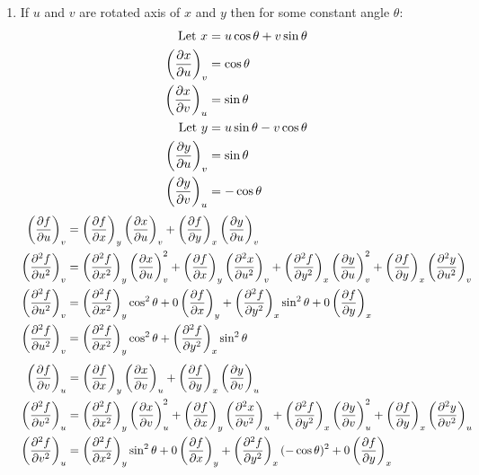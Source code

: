 \documentclass[10pt,\jkfside,a4paper]{article}
\begin{document}
\begin{enumerate}
\item If $u$ and $v$ are rotated axis of $x$ and $y$ then for some constant angle $\theta$:
\begin{equation}
\begin{split}
\text{Let } x &= u\cos\theta + v\sin\theta \\
\left(\pdv{x}{u}\right)_v &= \cos\theta \\
\left(\pdv{x}{v}\right)_u &= \sin\theta \\
\text{Let } y &= u\sin\theta - v\cos\theta \\
\left(\pdv{y}{u}\right)_v &= \sin\theta \\
\left(\pdv{y}{v}\right)_u &= -\cos\theta \\
\end{split}
\end{equation}
\begin{equation}
\begin{split}
\left(\pdv{f}{u}\right)_v &= \left(\pdv{f}{x}\right)_y\left(\pdv{x}{u}\right)_v + \left(\pdv{f}{y}\right)_x\left(\pdv{y}{u}\right)_v \\
\left(\pdv[2]{f}{u}\right)_v &= \left(\pdv[2]{f}{x}\right)_y\left(\pdv{x}{u}\right)^2_v + \left(\pdv{f}{x}\right)_y\left(\pdv[2]{x}{u}\right)_v + \left(\pdv[2]{f}{y}\right)_x\left(\pdv{y}{u}\right)^2_v + \left(\pdv{f}{y}\right)_x\left(\pdv[2]{y}{u}\right)_v\\
\left(\pdv[2]{f}{u}\right)_v &= \left(\pdv[2]{f}{x}\right)_y\cos^2\theta + 0\left(\pdv{f}{x}\right)_y + \left(\pdv[2]{f}{y}\right)_x\sin^2\theta + 0\left(\pdv{f}{y}\right)_x\\
\left(\pdv[2]{f}{u}\right)_v &= \left(\pdv[2]{f}{x}\right)_y\cos^2\theta + \left(\pdv[2]{f}{y}\right)_x\sin^2\theta \\
\end{split}
\end{equation}
\begin{equation}
\begin{split}
\left(\pdv{f}{v}\right)_u &= \left(\pdv{f}{x}\right)_y\left(\pdv{x}{v}\right)_u + \left(\pdv{f}{y}\right)_x\left(\pdv{y}{v}\right)_u \\
\left(\pdv[2]{f}{v}\right)_u &= \left(\pdv[2]{f}{x}\right)_y\left(\pdv{x}{v}\right)^2_u + \left(\pdv{f}{x}\right)_y\left(\pdv[2]{x}{v}\right)_u + \left(\pdv[2]{f}{y}\right)_x\left(\pdv{y}{v}\right)^2_u + \left(\pdv{f}{y}\right)_x\left(\pdv[2]{y}{v}\right)_u\\
\left(\pdv[2]{f}{v}\right)_u &= \left(\pdv[2]{f}{x}\right)_y\sin^2\theta + 0\left(\pdv{f}{x}\right)_y + \left(\pdv[2]{f}{y}\right)_x(-\cos\theta)^2 + 0\left(\pdv{f}{y}\right)_x\\

\end{split}
\end{equation}
\end{enumerate}
\end{document}
